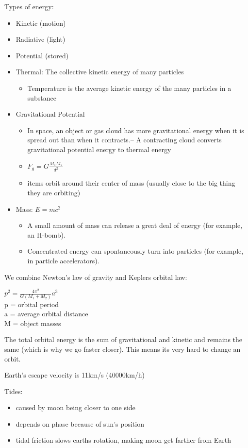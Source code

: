 Types of energy:
\begin{itemize}
\item Kinetic (motion)
\item Radiative (light)
\item Potential (stored)
\item Thermal: The collective kinetic energy of many particles
\begin{itemize}
\item Temperature is the average kinetic energy of the many particles in a substance
\end{itemize}
\item Gravitational Potential
\begin{itemize}
\item In space, an object or gas cloud has more gravitational energy when it is spread out than when it contracts.– A contracting cloud converts gravitational potential energy to thermal energy
\item $F_g = G\frac{M_1 M_2}{d^2}$
\item items orbit around their center of mass (usually close to the big thing they are orbiting)
\end{itemize}
\item Mass: $E = mc^2$
\begin{itemize}
\item A small amount of mass can release a great deal of energy (for example, an H-bomb).
\item Concentrated energy can spontaneously turn into particles (for example, in particle accelerators).
\end{itemize}
\end{itemize}

We combine Newton's law of gravity and Keplers orbital law:\\
\begin{center}
$p^2 = \frac{4\pi^2}{G(M_1 + M_2)}a^3$\\
p = orbital period\\
a = average orbital distance\\
M = object masses
\end{center}

The total orbital energy is the sum of gravitational and kinetic and remains the same (which is why we go faster closer). This means its very hard to change an orbit.

Earth's escape velocity is 11km/s (40000km/h)

Tides:
\begin{itemize}
\item caused by moon being closer to one side
\item depends on phase because of sun's position
\item tidal friction slows earths rotation, making moon get farther from Earth
\end{itemize}

